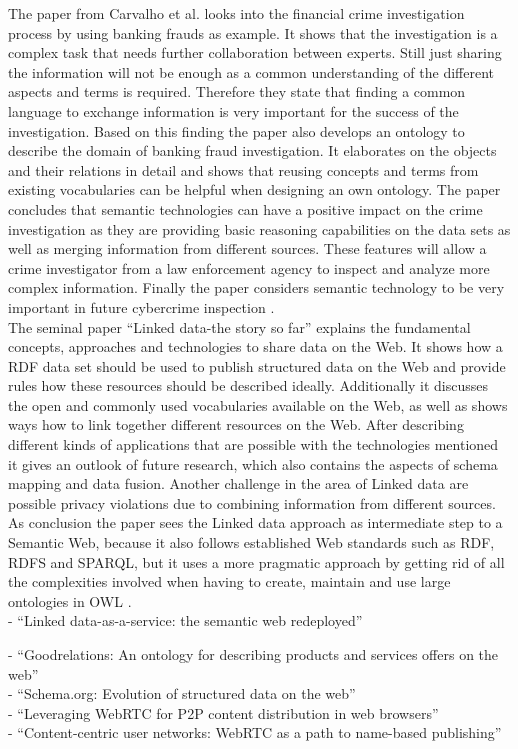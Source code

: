 The paper from Carvalho et al. looks into the financial crime investigation process by using banking frauds as example. It shows that the investigation is a complex task that needs further collaboration between experts. Still just sharing the information will not be enough as a common understanding of the different aspects and terms is required. Therefore they state that finding a common language to exchange information is very important for the success of the investigation. Based on this finding the paper also develops an ontology to describe the domain of banking fraud investigation. It elaborates on the objects and their relations in detail and shows that reusing concepts and terms from existing vocabularies can be helpful when designing an own ontology. The paper concludes that semantic technologies can have a positive impact on the crime investigation as they are providing basic reasoning capabilities on the data sets as well as merging information from different sources. These features will allow a crime investigator from a law enforcement agency to inspect and analyze more complex information. Finally the paper considers semantic technology to be very important in future cybercrime inspection \citep{carvalhoapplying}. \\

The seminal paper ``Linked data-the story so far'' explains the fundamental concepts, approaches and technologies to share data on the Web. It shows how a \gls{RDF} data set should be used to publish structured data on the Web and provide rules how these resources should be described ideally. Additionally it discusses the open and commonly used vocabularies available on the Web, as well as shows ways how to link together different resources on the Web. After describing different kinds of applications that are possible with the technologies mentioned it gives an outlook of future research, which also contains the aspects of schema mapping and data fusion. Another challenge in the area of Linked data are possible privacy violations due to combining information from different sources. As conclusion the paper sees the Linked data approach as intermediate step to a Semantic Web, because it also follows established Web standards such as \gls{RDF}, \gls{RDFS} and \gls{SPARQL}, but it uses a more pragmatic approach by getting rid of all the complexities involved when having to create, maintain and use large ontologies in \gls{OWL} \citep{bizer2009linked}. \\

- ``Linked data-as-a-service: the semantic web redeployed'' \citep{rietveld2015linked}

- ``Goodrelations: An ontology for describing products and services offers on the web'' \citep{hepp2008goodrelations} \\
- ``Schema.org: Evolution of structured data on the web'' \citep{guha2016schema} \\
- ``Leveraging WebRTC for P2P content distribution in web browsers'' \citep{vogt2013leveraging} \\
- ``Content-centric user networks: WebRTC as a path to name-based publishing'' \citep{vogt2013content}

